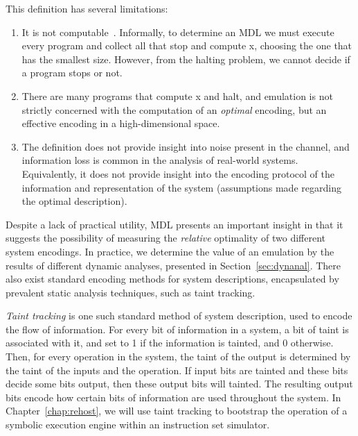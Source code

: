 \noindent
This definition has several limitations:
\begin{enumerate}
	\item It is not computable~\cite{cover1999elements}. Informally, to determine an
		MDL we must execute every program and collect all that stop and
		compute x, choosing the one that has the smallest size.
		However, from the halting problem, we cannot decide if a
		program stops or not. 
	\item There are many programs that compute x and halt, and emulation is
		not strictly concerned with the computation of an
		\emph{optimal} encoding, but an effective encoding in a
		high-dimensional space.
	\item The definition does not provide insight into noise present in the
		channel, and information loss is common in the analysis of real-world
		systems. Equivalently, it does not provide insight into the encoding protocol
		of the information and representation of the system (assumptions made regarding
		the optimal description).
\end{enumerate}

Despite a lack of practical utility, MDL presents an important insight in that it suggests the possibility of measuring the \emph{relative} optimality of two different system encodings.
In practice, we determine the value of an emulation by the results of different dynamic analyses, presented in Section~\ref{sec:dynanal}.
There also exist standard encoding methods for system descriptions, encapsulated by prevalent static analysis techniques, such as taint tracking.

\emph{Taint tracking} is one such standard method of system description, used to encode the flow of information.
For every bit of information in a system, a bit of taint is associated with it, and set to 1 if the information is tainted, and 0 otherwise.
Then, for every operation in the system, the taint of the output is determined by the taint of the inputs and the operation.
If input bits are tainted and these bits decide some bits output, then these output bits will tainted.
The resulting output bits encode how certain bits of information are used throughout the system.
In Chapter~\ref{chap:rehost}, we will use taint tracking to bootstrap the operation of a symbolic execution engine within an instruction set simulator.

